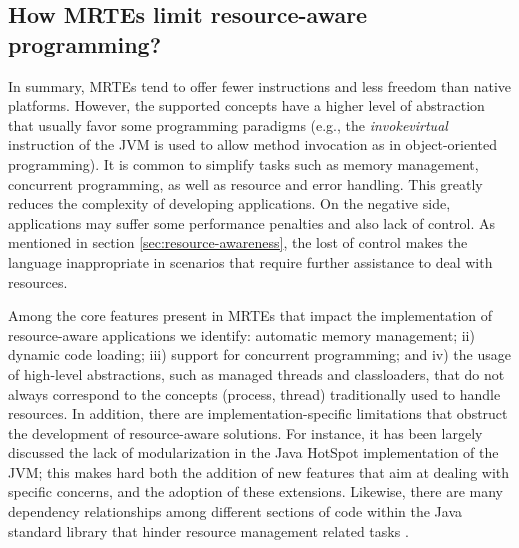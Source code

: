 \subsection{How MRTEs limit resource-aware programming?}

In summary, MRTEs tend to offer fewer instructions and less freedom than native platforms.
However, the supported concepts have a higher level of abstraction that usually favor some programming paradigms (e.g., the \textit{invokevirtual} instruction of the JVM is used to allow method invocation as in object-oriented programming).
It is common to simplify tasks such as memory management, concurrent programming, as well as resource and error handling.
This greatly reduces the complexity of developing applications.
On the negative side, applications may suffer some performance penalties and also lack of control.
As mentioned in section \ref{sec:resource-awareness}, the lost of control makes the language inappropriate in scenarios that require further assistance to deal with resources.

Among the core features present in MRTEs that impact the implementation of resource-aware applications we identify: automatic memory management; ii) dynamic code loading; iii) support for concurrent programming; and iv) the usage of high-level abstractions, such as managed threads and classloaders,  that do not always correspond to the concepts (process, thread) traditionally used to handle resources.
In addition, there are implementation-specific limitations that obstruct the development of resource-aware solutions.
For instance, it has been largely discussed \cite{Doyle2002,Fong:2004:PVM:1028976.1029010,1420998} the lack of modularization in the Java HotSpot implementation of the JVM; this makes hard both the addition of new features that aim at dealing with specific concerns, and the adoption of these extensions.
Likewise, there are many dependency relationships among different sections of code within the Java standard library that hinder resource management related tasks \cite{Blackburn2008,Kell:2012:JOE:2414740.2414747}.

%
%
%
%
%

